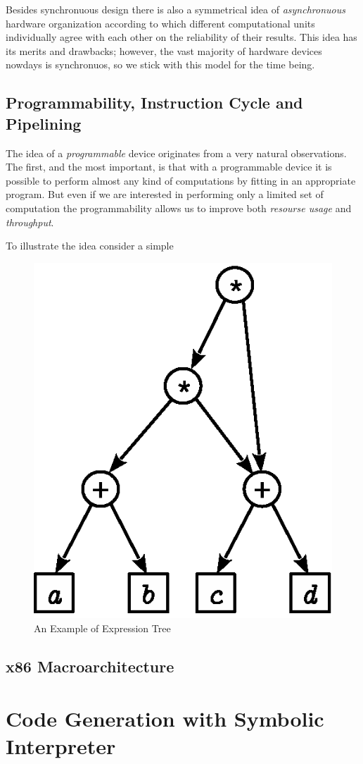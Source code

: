 Besides synchronuous design there is also a symmetrical idea of \emph{asynchronuous} hardware organization according to which
different computational units individually agree with each other on the reliability of their results. This idea has its
merits and drawbacks; however, the vast majority of hardware devices nowdays is synchronuos, so we stick with this model for
the time being.

\subsection{Programmability, Instruction Cycle and Pipelining}

The idea of a \emph{programmable} device originates from a very natural observations. The first, and the most important, is
that with a programmable device it is possible to perform almost any kind of computations by fitting in an appropriate program.
But even if we are interested in performing only a limited set of computation the programmability allows us to improve
both \emph{resourse usage} and \emph{throughput}.

To illustrate the idea consider a simple 

\begin{figure}[t]
  \centering
  \includegraphics[scale=0.5]{images/06-11.eps}
  \caption{An Example of Expression Tree}
  \label{expression-example}
\end{figure}

\subsection{x86 Macroarchitecture}

\section{Code Generation with Symbolic Interpreter}

\section{}


